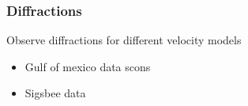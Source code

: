 \begin{frame}
	 {}
	 {}
\end{frame}	
\begin{frame} \frametitle{Diffractions}
Observe diffractions for different velocity models 
\begin{itemize}
   \item Gulf of mexico data scons 
   \item Sigsbee data 
\end{itemize}

\end{frame}
\cwpnote{}

